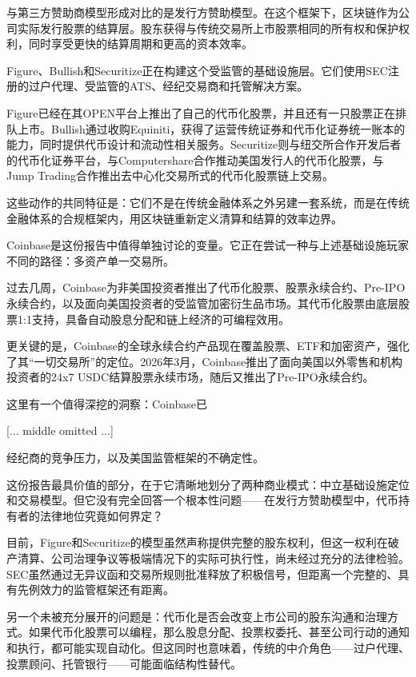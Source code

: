 \documentclass[11pt]{ctexart}
\begin{document}
与第三方赞助商模型形成对比的是发行方赞助模型。在这个框架下，区块链作为公司实际发行股票的结算层。股东获得与传统交易所上市股票相同的所有权和保护权利，同时享受更快的结算周期和更高的资本效率。

Figure、Bullish和Securitize正在构建这个受监管的基础设施层。它们使用SEC注册的过户代理、受监管的ATS、经纪交易商和托管解决方案。

Figure已经在其OPEN平台上推出了自己的代币化股票，并且还有一只股票正在排队上市。Bullish通过收购Equiniti，获得了运营传统证券和代币化证券统一账本的能力，同时提供代币设计和流动性相关服务。Securitize则与纽交所合作开发后者的代币化证券平台，与Computershare合作推动美国发行人的代币化股票，与Jump Trading合作推出去中心化交易所式的代币化股票链上交易。

这些动作的共同特征是：它们不是在传统金融体系之外另建一套系统，而是在传统金融体系的合规框架内，用区块链重新定义清算和结算的效率边界。

Coinbase是这份报告中值得单独讨论的变量。它正在尝试一种与上述基础设施玩家不同的路径：多资产单一交易所。

过去几周，Coinbase为非美国投资者推出了代币化股票、股票永续合约、Pre-IPO永续合约，以及面向美国投资者的受监管加密衍生品市场。其代币化股票由底层股票1:1支持，具备自动股息分配和链上经济的可编程效用。

更关键的是，Coinbase的全球永续合约产品现在覆盖股票、ETF和加密资产，强化了其“一切交易所”的定位。2026年3月，Coinbase推出了面向美国以外零售和机构投资者的24x7 USDC结算股票永续市场，随后又推出了Pre-IPO永续合约。

这里有一个值得深挖的洞察：Coinbase已

[... middle omitted ...]

经纪商的竞争压力，以及美国监管框架的不确定性。

这份报告最具价值的部分，在于它清晰地划分了两种商业模式：中立基础设施定位和交易模型。但它没有完全回答一个根本性问题——在发行方赞助模型中，代币持有者的法律地位究竟如何界定？

目前，Figure和Securitize的模型虽然声称提供完整的股东权利，但这一权利在破产清算、公司治理争议等极端情况下的实际可执行性，尚未经过充分的法律检验。SEC虽然通过无异议函和交易所规则批准释放了积极信号，但距离一个完整的、具有先例效力的监管框架还有距离。

另一个未被充分展开的问题是：代币化是否会改变上市公司的股东沟通和治理方式。如果代币化股票可以编程，那么股息分配、投票权委托、甚至公司行动的通知和执行，都可能实现自动化。但这同时也意味着，传统的中介角色——过户代理、投票顾问、托管银行——可能面临结构性替代。
\end{document}
